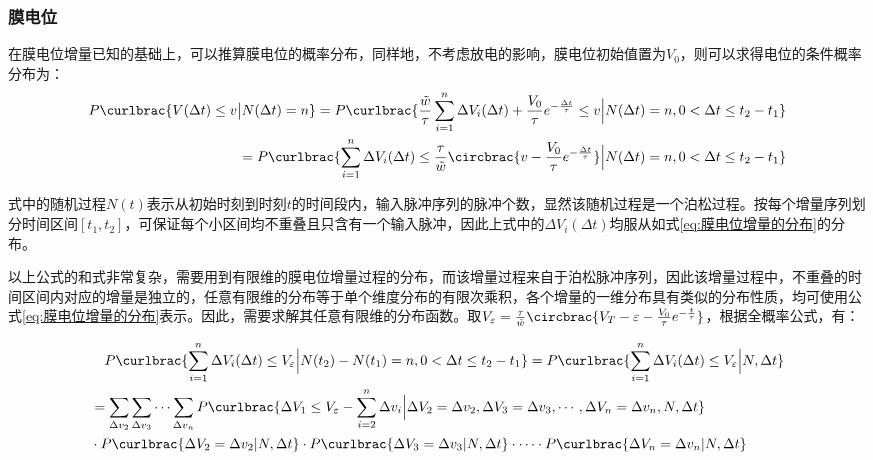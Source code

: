 \documentclass[11pt]{article}
\begin{document}
\subsubsection{膜电位}
在膜电位增量已知的基础上，可以推算膜电位的概率分布，同样地，不考虑放电的影响，膜电位初始值置为$V_0$，则可以求得电位的条件概率分布为：
\begin{align}
  \begin{aligned}
    P\curlbrac{V(\Delta t)\le v
    \big|  N(\Delta t)=n}  =P\curlbrac{\frac{\tilde{w}}{\tau}\sum_{i=1}^{n}\Delta V_i(\Delta t)+\frac{V_0}{\tau}e^{-\frac{\Delta t}{\tau}}\le v\Big| N(\Delta t)=n,0<\Delta t\le t_2-t_1}            \\
                    =P\curlbrac{\sum_{i=1}^{n}\Delta V_i(\Delta t)\le \frac{\tau}{\tilde{w}}\circbrac{v-\frac{V_0}{\tau}e^{-\frac{\Delta t}{\tau}}}\Big| N(\Delta t)=n,0<\Delta t\le t_2-t_1}
  \end{aligned} \label{eq:膜电位的条件分布概率}
\end{align}\par
式中的随机过程$N(t)$表示从初始时刻到时刻$t$的时间段内，输入脉冲序列的脉冲个数，显然该随机过程是一个泊松过程。按每个增量序列划分时间区间$[t_1,t_2]$，可保证每个小区间均不重叠且只含有一个输入脉冲，因此上式中的$\Delta V_i(\Delta t)$均服从如式\ref{eq:膜电位增量的分布}的分布。\par
以上公式的和式非常复杂，需要用到有限维的膜电位增量过程的分布，而该增量过程来自于泊松脉冲序列，因此该增量过程中，不重叠的时间区间内对应的增量是独立的，任意有限维的分布等于单个维度分布的有限次乘积，各个增量的一维分布具有类似的分布性质，均可使用公式\ref{eq:膜电位增量的分布}表示。因此，需要求解其任意有限维的分布函数。取$V_\varepsilon=\frac{\tau}{\tilde{w}}\circbrac{V_T-\varepsilon-\frac{V_0}{\tau}e^{-\frac{t}{\tau}}}$，根据全概率公式，有：\par
\begin{align}
  \begin{aligned}
     & \quad P\curlbrac{\sum_{i=1}^{n}\Delta V_i(\Delta t)\le V_\varepsilon\Big| N(t_2)-N(t_1)=n,0<\Delta t\le t_2-t_1}=P\curlbrac{\sum_{i=1}^{n}\Delta V_i(\Delta t)\le V_\varepsilon\Big| N,\Delta t} \\
     & =\sum_{\Delta v_2}\sum_{\Delta v_3}\cdots\sum_{\Delta v_n}P\curlbrac{\Delta V_1\le V_\varepsilon-\sum_{i=2}^{n}\Delta v_i
    \Big|\Delta V_2=\Delta v_2,\Delta V_3=\Delta v_3,\cdots,\Delta V_n=\Delta v_n,N,\Delta t}                                                                                                           \\
     & \cdot P\curlbrac{\Delta V_2=\Delta v_2|N,\Delta t}\cdot P\curlbrac{\Delta V_3=\Delta v_3|N,\Delta t}\cdot \cdots \cdot P\curlbrac{\Delta V_n=\Delta v_n|N,\Delta t}
  \end{aligned}
\end{align}\par
\end{document}
